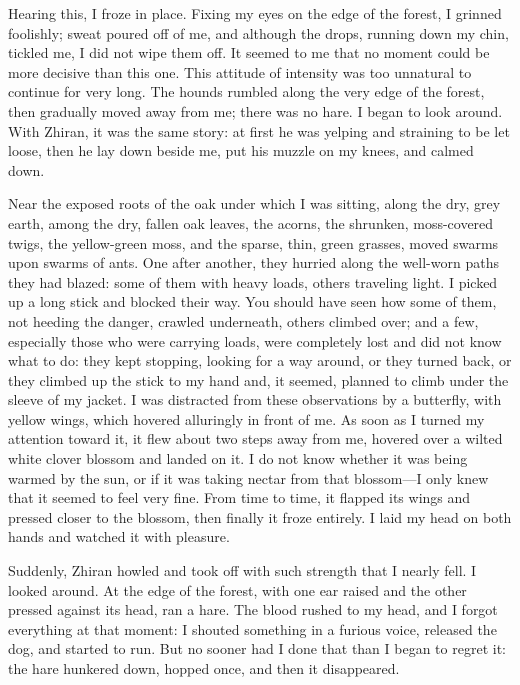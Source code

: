 Hearing this, I froze in place. Fixing my eyes on the edge of the forest, I grinned foolishly; sweat poured off of me, and although the drops, running down my chin, tickled me, I did not wipe them off. It seemed to me that no moment could be more decisive than this one. This attitude of intensity was too unnatural to continue for very long. The hounds rumbled along the very edge of the forest, then gradually moved away from me; there was no hare. I began to look around. With Zhiran, it was the same story: at first he was yelping and straining to be let loose, then he lay down beside me, put his muzzle on my knees, and calmed down.

Near the exposed roots of the oak under which I was sitting, along the dry, grey earth, among the dry, fallen oak leaves, the acorns, the shrunken, moss-covered twigs, the yellow-green moss, and the sparse, thin, green grasses, moved swarms upon swarms of ants. One after another, they hurried along the well-worn paths they had blazed: some of them with heavy loads, others traveling light. I picked up a long stick and blocked their way. You should have seen how some of them, not heeding the danger, crawled underneath, others climbed over; and a few, especially those who were carrying loads, were completely lost and did not know what to do: they kept stopping, looking for a way around, or they turned back, or they climbed up the stick to my hand and, it seemed, planned to climb under the sleeve of my jacket. I was distracted from these observations by a butterfly, with yellow wings, which hovered alluringly in front of me. As soon as I turned my attention toward it, it flew about two steps away from me, hovered over a wilted white clover blossom and landed on it. I do not know whether it was being warmed by the sun, or if it was taking nectar from that blossom---I only knew that it seemed to feel very fine. From time to time, it flapped its wings and pressed closer to the blossom, then finally it froze entirely. I laid my head on both hands and watched it with pleasure.

Suddenly, Zhiran howled and took off with such strength that I nearly fell. I looked around. At the edge of the forest, with one ear raised and the other pressed against its head, ran a hare. The blood rushed to my head, and I forgot everything at that moment: I shouted something in a furious voice, released the dog, and started to run. But no sooner had I done that than I began to regret it: the hare hunkered down, hopped once, and then it disappeared.


